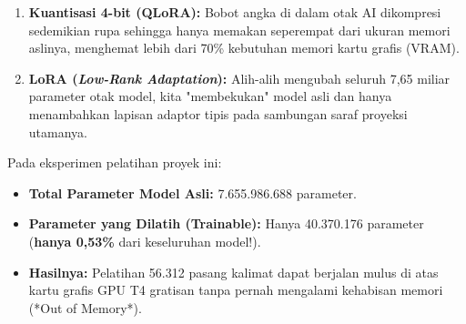 \begin{enumerate}
    \item \textbf{Kuantisasi 4-bit (QLoRA):} Bobot angka di dalam otak AI dikompresi sedemikian rupa sehingga hanya memakan seperempat dari ukuran memori aslinya, menghemat lebih dari 70\% kebutuhan memori kartu grafis (VRAM).
    \item \textbf{LoRA (\textit{Low-Rank Adaptation}):} Alih-alih mengubah seluruh 7,65 miliar parameter otak model, kita "membekukan" model asli dan hanya menambahkan lapisan adaptor tipis pada sambungan saraf proyeksi utamanya.
\end{enumerate}

\begin{metricbox}
Pada eksperimen pelatihan proyek ini:
\begin{itemize}
    \item \textbf{Total Parameter Model Asli:} 7.655.986.688 parameter.
    \item \textbf{Parameter yang Dilatih (Trainable):} Hanya 40.370.176 parameter (\textbf{hanya 0,53\%} dari keseluruhan model!).
    \item \textbf{Hasilnya:} Pelatihan 56.312 pasang kalimat dapat berjalan mulus di atas kartu grafis GPU T4 gratisan tanpa pernah mengalami kehabisan memori (*Out of Memory*).
\end{itemize}
\end{metricbox}
